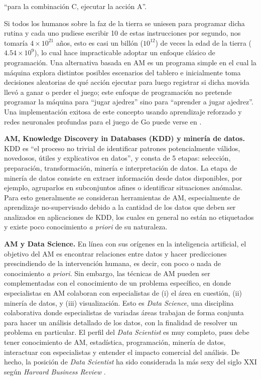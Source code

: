 \vspace{1em}
\centerline{“para la combinación C, ejecutar la acción A”.}
\vspace{1em}
\noindent Si todos los humanos sobre la faz de la tierra se uniesen para programar dicha rutina y cada uno pudiese escribir 10 de estas instrucciones por segundo, nos tomaría $4\times10^{21}$ años, esto es casi un billón ($10^{12}$) de veces la edad de la tierra ($4.54\times10^9$), lo cual hace impracticable adoptar un enfoque clásico de programación. Una alternativa basada en AM es un programa simple en el cual la máquina explora distintos posibles escenarios del tablero e inicialmente toma decisiones aleatorias de qué acción ejecutar para luego registrar si dicha movida llevó a ganar o perder el juego; este enfoque de programación no pretende programar la máquina para “jugar ajedrez” sino para “aprender a jugar ajedrez”. Una implementación exitosa de este concepto usando aprendizaje reforzado y redes neuronales profundas para el juego de Go puede verse en \cite{silver_2016}.


\textbf{AM, Knowledge Discovery in Databases (KDD) y minería de datos.} KDD \cite{fayyad_1996} es “el proceso no trivial de identificar patrones potencialmente válidos, novedosos, útiles y explicativos en datos”, y consta de 5 etapas: selección, preparación, transformación, minería e interpretación de datos. La etapa de minería de datos  consiste en extraer información desde datos disponibles, por ejemplo, agruparlos en subconjuntos afines o identificar situaciones anómalas. Para esto generalmente se consideran herramientas de AM, especialmente de aprendizaje no-supervisado debido a la cantidad de los datos que deben ser analizados en aplicaciones de KDD, los cuales en general no están no etiquetados y existe poco conocimiento \emph{a priori} de su naturaleza. 

\textbf{AM y Data Science.} En línea con sus orígenes en la inteligencia artificial, el objetivo del AM es encontrar relaciones entre datos y hacer predicciones prescindiendo de la intervención humana, es decir, con poco o nada de conocimiento \emph{a priori}. Sin embargo, las técnicas de AM pueden ser complementadas con el conocimiento de un problema específico, en donde especialistas en AM colaboran con especialistas de (i) el área en cuestión, (ii) minería de datos, y (iii) visualización. Esto es \emph{Data Science}, una disciplina colaborativa donde especialistas de variadas áreas trabajan de forma conjunta para hacer un análisis detallado de los datos, con la finalidad de resolver un problema en particular. El perfil del \emph{Data Scientist} es muy completo, pues debe tener conocimiento de AM, estadística, programación, minería de datos, interactuar con especialistas y entender el impacto comercial del análisis. De hecho, la posición de \emph{Data Scientist} ha sido considerada la más sexy del siglo XXI según \emph{Harvard Business Review} \cite{harvard_DS}.


